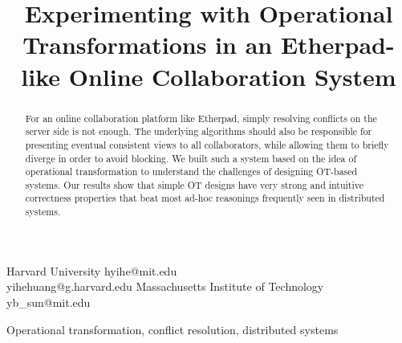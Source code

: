 \documentclass[preprint,nocopyrightspace]{sigplanconf}
\begin{document}
\setlength{\pdfpageheight}{\paperheight}
\setlength{\pdfpagewidth}{\paperwidth}






\title{Experimenting with Operational Transformations in an Etherpad-like Online Collaboration System}

  {Harvard University}
  {hyihe@mit.edu\\yihehuang@g.harvard.edu}
  {Massachusetts Institute of Technology}
  {yb\_sun@mit.edu}

\maketitle

\begin{abstract}

For an online collaboration platform like Etherpad, simply resolving conflicts
on the server side is not enough. The underlying algorithms should also be
responsible for presenting eventual consistent views to all collaborators,
while allowing them to briefly diverge in order to avoid blocking. We built
such a system based on the idea of operational transformation to understand
the challenges of designing OT-based systems. Our results show that simple OT
designs have very strong and intuitive correctness properties that beat most
ad-hoc reasonings frequently seen in distributed systems.

\end{abstract}



\keywords
Operational transformation, conflict resolution, distributed systems












\end{document}
